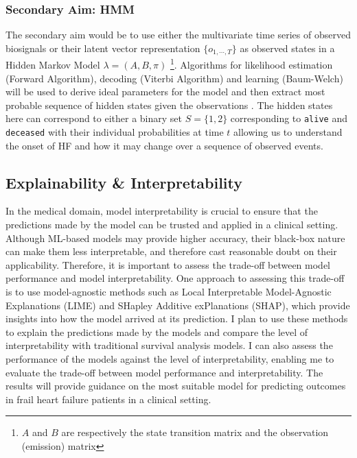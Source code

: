 \documentclass[%
 reprint,
 amsmath,amssymb,
 aps,
 nofootinbib,
]{revtex4-2}
\theoremstyle{definition}
\begin{document}
\subsubsection{\label{sec}Secondary Aim: HMM}
The secondary aim would be to use either the multivariate time series of observed biosignals or their latent vector representation $\{o_{1,\cdots,T}\}$ as observed states in a Hidden Markov Model $\lambda = (A,B,\pi)$ \footnote{$A$ and $B$ are respectively the state transition matrix and the observation (emission) matrix}. Algorithms for likelihood estimation (Forward Algorithm), decoding (Viterbi Algorithm) and learning (Baum-Welch) will be used to derive ideal parameters for the model and then extract most probable sequence of hidden states given the observations \citep{keselj2009speech}. The hidden states here can correspond to either a binary set $S = \{1 , 2\}$ corresponding to \texttt{alive} and \texttt{deceased} with their individual probabilities at time $t$ allowing us to understand the onset of HF and how it may change over a sequence of observed events.


\subsection{\label{expla}Explainability \& Interpretability}
In the medical domain, model interpretability is crucial to ensure that the predictions made by the model can be trusted and applied in a clinical setting. Although ML-based models may provide higher accuracy, their black-box nature can make them less interpretable, and therefore cast reasonable doubt on their applicability. Therefore, it is important to assess the trade-off between model performance and model interpretability. One approach to assessing this trade-off is to use model-agnostic methods such as Local Interpretable Model-Agnostic Explanations (LIME) and SHapley Additive exPlanations (SHAP), which provide insights into how the model arrived at its prediction. I plan to use these methods to explain the predictions made by the models and compare the level of interpretability with traditional survival analysis models. I can also assess the performance of the models against the level of interpretability, enabling me to evaluate the trade-off between model performance and interpretability. The results will provide guidance on the most suitable model for predicting outcomes in frail heart failure patients in a clinical setting.
\end{document}
